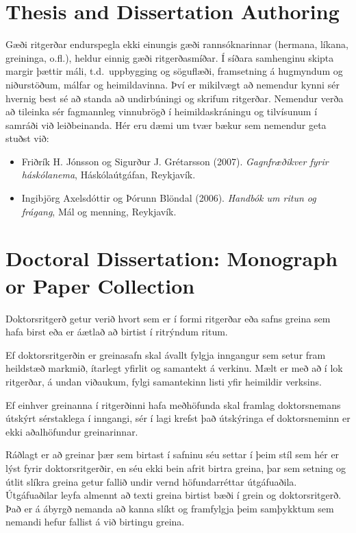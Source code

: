 \documentclass[a4paper,12pt,twoside,BCOR=10mm]{scrbook}
\begin{document}
\section{Thesis and Dissertation Authoring}
Gæði ritgerðar endurspegla ekki einungis gæði rannsóknarinnar (hermana, líkana, greininga, o.fl.), heldur einnig gæði ritgerðasmíðar. Í síðara samhenginu skipta margir þættir máli, t.d.\ uppbygging og söguflæði, framsetning á hugmyndum og niðurstöðum, málfar og heimildavinna. Því er mikilvægt að nemendur kynni sér hvernig best sé að standa að undirbúningi og skrifum ritgerðar. Nemendur verða að tileinka sér fagmannleg vinnubrögð í heimildaskráningu og tilvísunum í samráði við leiðbeinanda. Hér eru dæmi um tvær bækur sem nemendur geta stuðst við:
\begin{itemize}
 \item Friðrík H. Jónsson og Sigurður J. Grétarsson (2007). \textit{Gagnfræðikver fyrir háskólanema}, Háskólaútgáfan, Reykjavík.~\cite{JonssonGretarsson2018}
 \item Ingibjörg Axelsdóttir og Þórunn Blöndal (2006).  \textit{Handbók um ritun og frágang},  Mál og menning, Reykjavík.~\cite{AxelsdottirBlondal2006}
\end{itemize}


\section{Doctoral Dissertation: Monograph or Paper Collection}
Doktorsritgerð getur verið hvort sem er í formi ritgerðar eða safns greina sem hafa birst eða  er áætlað að birtist í ritrýndum ritum. 

Ef doktorsritgerðin er greinasafn skal ávallt fylgja inngangur sem setur fram heildstæð markmið, ítarlegt yfirlit og samantekt á verkinu. Mælt er með að í lok ritgerðar, á undan viðaukum, fylgi samantekinn listi yfir heimildir verksins.

Ef einhver greinanna í ritgerðinni hafa meðhöfunda skal framlag doktorsnemans útskýrt sérstaklega í inngangi, sér í lagi krefst það útskýringa ef doktorsneminn er ekki aðalhöfundur greinarinnar. 

Ráðlagt er að greinar þær sem birtast í safninu séu settar í þeim stíl sem hér er lýst fyrir doktorsritgerðir, en séu ekki bein afrit birtra greina, þar sem setning og útlit slíkra greina getur fallið undir vernd höfundarréttar útgáfuaðila. Útgáfuaðilar leyfa almennt að texti greina birtist bæði í grein og doktorsritgerð. Það er á ábyrgð nemanda að kanna slíkt og framfylgja þeim samþykktum sem nemandi hefur fallist á við birtingu greina.
 
\end{document}
